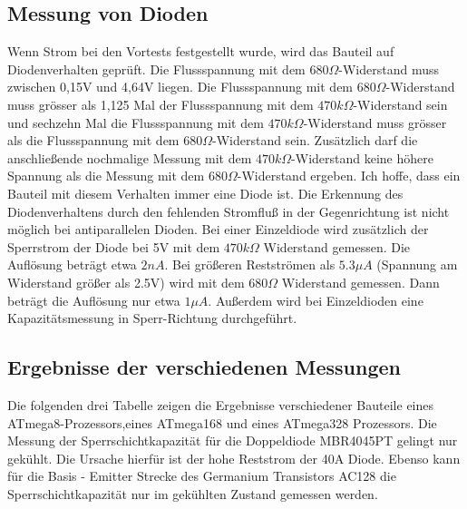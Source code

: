 \subsection{Messung von Dioden}
\label{sec:diode}
Wenn Strom bei den Vortests festgestellt wurde, wird das Bauteil auf Diodenverhalten geprüft.
Die Flussspannung mit dem \(680\Omega\)-Widerstand muss zwischen 0,15V und 4,64V liegen.
Die Flussspannung mit dem \(680\Omega\)-Widerstand muss grösser als 1,125 Mal der Flussspannung mit dem
 \(470k\Omega\)-Widerstand sein und sechzehn Mal die Flussspannung mit dem \(470k\Omega\)-Widerstand muss
grösser als die Flussspannung mit dem \(680\Omega\)-Widerstand sein.
Zusätzlich darf die anschließende nochmalige Messung mit dem \(470k\Omega\)-Widerstand  keine höhere Spannung als die
Messung mit dem \(680\Omega\)-Widerstand ergeben.
Ich hoffe, dass ein Bauteil mit diesem Verhalten immer eine Diode ist.
Die Erkennung des Diodenverhaltens durch den fehlenden Stromfluß in der Gegenrichtung ist nicht
möglich bei antiparallelen Dioden.
Bei einer Einzeldiode wird zusätzlich der Sperrstrom der Diode bei 5V mit dem \(470k\Omega\) Widerstand
gemessen. Die Auflösung beträgt etwa \(2nA\). Bei größeren Restströmen als \(5.3\mu A\) (Spannung am Widerstand größer als 2.5V) wird
 mit dem \(680\Omega\) Widerstand gemessen. Dann beträgt die Auflösung nur etwa \(1\mu A\).
Außerdem wird bei Einzeldioden eine Kapazitätsmessung in Sperr-Richtung durchgeführt. 

\subsection{Ergebnisse der verschiedenen Messungen}
Die folgenden drei Tabelle zeigen die Ergebnisse verschiedener Bauteile 
eines ATmega8-Prozessors,eines ATmega168 und eines ATmega328 Prozessors.
Die Messung der Sperrschichtkapazität für die Doppeldiode MBR4045PT gelingt
nur gekühlt. Die Ursache hierfür ist der hohe Reststrom der 40A Diode. Ebenso kann für die Basis - Emitter
Strecke des Germanium Transistors AC128 die Sperrschichtkapazität nur im
gekühlten Zustand gemessen werden. 

